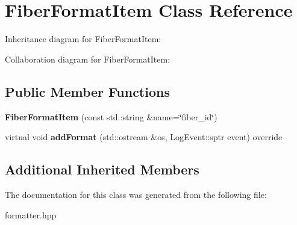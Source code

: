 \hypertarget{classFiberFormatItem}{}\section{Fiber\+Format\+Item Class Reference}
\label{classFiberFormatItem}


Inheritance diagram for Fiber\+Format\+Item\+:


Collaboration diagram for Fiber\+Format\+Item\+:
\subsection*{Public Member Functions}
\begin{DoxyCompactItemize}
\item 
\mbox{\label{classFiberFormatItem_a39495b415af78ca2a783b002b7673ba8}} 
{\bfseries Fiber\+Format\+Item} (const std\+::string \&name=\char`\"{}fiber\+\_\+id\char`\"{})
\item 
\mbox{\label{classFiberFormatItem_a7a7a6649e16b23d9c8451ce2cf88df3f}} 
virtual void {\bfseries add\+Format} (std\+::ostream \&os, Log\+Event\+::sptr event) override
\end{DoxyCompactItemize}
\subsection*{Additional Inherited Members}


The documentation for this class was generated from the following file\+:\begin{DoxyCompactItemize}
\item 
formatter.\+hpp\end{DoxyCompactItemize}
